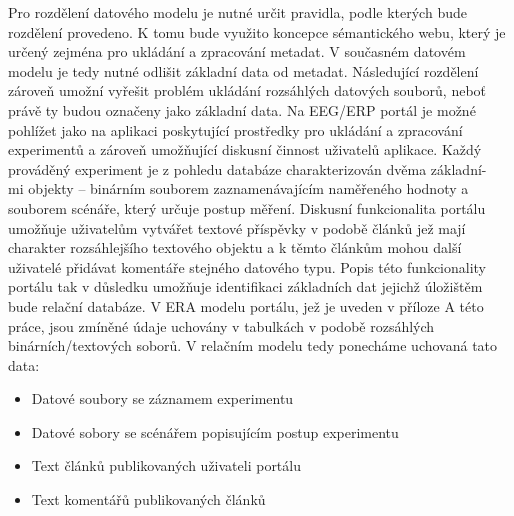 \documentclass{projekt}
\begin{document}
Pro rozdělení datového modelu je nutné určit pravidla, podle kterých bude rozdělení provedeno. K tomu bude využito koncepce sémantického webu, který je určený zejména pro ukládání a zpracování metadat. V současném datovém modelu je tedy nutné odlišit základní data od metadat. Následující rozdělení zároveň umožní vyřešit problém ukládání rozsáhlých datových souborů, neboť právě ty budou označeny jako základní data. Na EEG/ERP portál je možné pohlížet jako na aplikaci poskytující prostředky pro ukládání a zpracování experimentů a zároveň umožňující diskusní činnost uživatelů aplikace. Každý prováděný experiment je z pohledu databáze charakterizován dvěma základní-\\mi objekty – binárním souborem zaznamenávajícím naměřeného hodnoty a souborem scénáře, který určuje postup měření. Diskusní funkcionalita portálu umožňuje uživatelům vytvářet textové příspěvky v podobě článků jež mají charakter rozsáhlejšího textového objektu a k těmto článkům mohou další uživatelé přidávat komentáře stejného datového typu. Popis této funkcionality portálu tak v důsledku umožňuje identifikaci základních dat jejichž úložištěm bude relační databáze. V ERA modelu portálu, jež je uveden v příloze A této práce, jsou zmíněné údaje uchovány v tabulkách v podobě rozsáhlých binárních/textových soborů. V relačním modelu tedy ponecháme uchovaná tato data: 



\begin{itemize}
\item Datové soubory se záznamem experimentu
\item Datové sobory se scénářem popisujícím postup experimentu
\item Text článků publikovaných uživateli portálu
\item Text komentářů publikovaných článků
\end{itemize}
\end{document}

